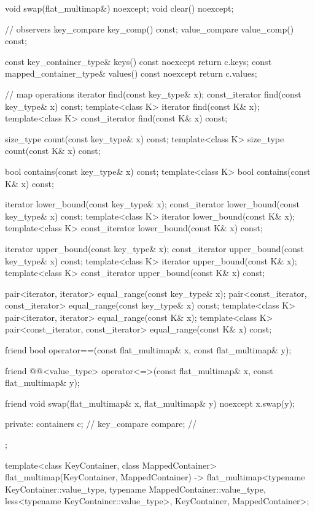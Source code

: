 \begin{codeblock}
{{    void swap(flat_multimap&) noexcept;
    void clear() noexcept;

    // observers
    key_compare key_comp() const;
    value_compare value_comp() const;

    const key_container_type& keys() const noexcept { return c.keys; }
    const mapped_container_type& values() const noexcept { return c.values; }

    // map operations
    iterator find(const key_type& x);
    const_iterator find(const key_type& x) const;
    template<class K> iterator find(const K& x);
    template<class K> const_iterator find(const K& x) const;

    size_type count(const key_type& x) const;
    template<class K> size_type count(const K& x) const;

    bool contains(const key_type& x) const;
    template<class K> bool contains(const K& x) const;

    iterator lower_bound(const key_type& x);
    const_iterator lower_bound(const key_type& x) const;
    template<class K> iterator lower_bound(const K& x);
    template<class K> const_iterator lower_bound(const K& x) const;

    iterator upper_bound(const key_type& x);
    const_iterator upper_bound(const key_type& x) const;
    template<class K> iterator upper_bound(const K& x);
    template<class K> const_iterator upper_bound(const K& x) const;

    pair<iterator, iterator> equal_range(const key_type& x);
    pair<const_iterator, const_iterator> equal_range(const key_type& x) const;
    template<class K>
      pair<iterator, iterator> equal_range(const K& x);
    template<class K>
      pair<const_iterator, const_iterator> equal_range(const K& x) const;

    friend bool operator==(const flat_multimap& x, const flat_multimap& y);

    friend @@<value_type>
      operator<=>(const flat_multimap& x, const flat_multimap& y);

    friend void swap(flat_multimap& x, flat_multimap& y) noexcept
      { x.swap(y); }

  private:
    containers c;               // \expos
    key_compare compare;        // \expos
  };

  template<class KeyContainer, class MappedContainer>
    flat_multimap(KeyContainer, MappedContainer)
      -> flat_multimap<typename KeyContainer::value_type, typename MappedContainer::value_type,
                       less<typename KeyContainer::value_type>, KeyContainer, MappedContainer>;

}
\end{codeblock}
